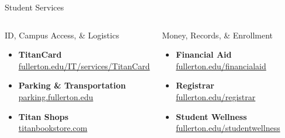 \documentclass[10pt]{beamer}
\begin{document}
\begin{frame}{Student Services}
\begin{columns}[T,onlytextwidth]
  \begin{block}{ID, Campus Access, \& Logistics}
    \begin{itemize}\setlength{\itemsep}{4pt}
      \item \textbf{TitanCard}\\[-2pt]
        \footnotesize\href{https://www.fullerton.edu/IT/services/TitanCard}{fullerton.edu/IT/services/TitanCard}
      \item \textbf{Parking \& Transportation}\\[-2pt]
        \footnotesize\href{https://parking.fullerton.edu}{parking.fullerton.edu}
      \item \textbf{Titan Shops}\\[-2pt]
        \footnotesize\href{https://www.titanbookstore.com}{titanbookstore.com}
    \end{itemize}
  \end{block}

  \begin{block}{Money, Records, \& Enrollment}
    \begin{itemize}\setlength{\itemsep}{4pt}
      \item \textbf{Financial Aid}\\[-2pt]
        \footnotesize\href{https://www.fullerton.edu/financialaid}{fullerton.edu/financialaid}
      \item \textbf{Registrar}\\[-2pt]
        \footnotesize\href{https://www.fullerton.edu/registrar}{fullerton.edu/registrar}
      \item \textbf{Student Wellness}\\[-2pt]
        \footnotesize\href{https://www.fullerton.edu/studentwellness}{fullerton.edu/studentwellness}
    \end{itemize}
  \end{block}
\end{columns}
\end{frame}
\end{document}
